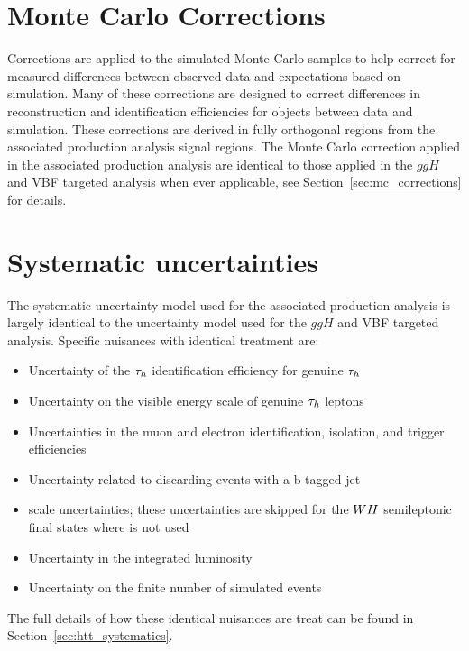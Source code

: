 \section{Monte Carlo Corrections}
\label{sec:vh_mc_corrections}
Corrections are applied to the simulated Monte Carlo samples to help correct for measured differences
between observed data and expectations based on simulation. Many of these corrections are designed
to correct differences in reconstruction and identification efficiencies for objects between data
and simulation. These corrections are derived in
fully orthogonal regions from the associated production analysis signal regions.
The Monte Carlo correction applied in the associated production analysis are identical to those
applied in the $ggH$ and VBF targeted analysis when ever applicable, see 
Section~\ref{sec:mc_corrections} for details.



\section{Systematic uncertainties}
\label{sec:vh_systematics}
The systematic uncertainty model used for the associated production analysis is largely
identical to the uncertainty model used for the $ggH$ and VBF targeted analysis.
Specific nuisances with identical treatment are:
\begin{itemize}
\item Uncertainty of the $\tau_{h}$ identification efficiency for genuine $\tau_{h}$
\item Uncertainty on the visible energy scale of genuine $\tau_{h}$ leptons
\item Uncertainties in the muon and electron identification, isolation, and trigger efficiencies
\item Uncertainty related to discarding events with a b-tagged jet
\item \etvecmiss scale uncertainties; these uncertainties are skipped for the
$WH$ semileptonic final states where \etvecmiss is not used
\item Uncertainty in the integrated luminosity
\item Uncertainty on the finite number of simulated events
\end{itemize}
The full details of how these identical nuisances are treat can be found in
Section~\ref{sec:htt_systematics}.


